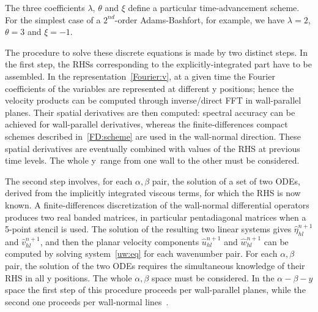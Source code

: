The three coefficients $\lambda$, $\theta$ and $\xi$ define a particular time-advancement scheme. For the simplest case of a $2^{nd}$-order Adams-Bashfort, for example, we have $\lambda= 2$, $\theta = 3$ and $\xi = -1$.\par
The procedure to solve these discrete equations is made by two distinct steps. In the first step, the RHSs corresponding to the explicitly-integrated  part have to be assembled. In the representation~\ref{Fourier:v}, at a given time the Fourier coefficients of the variables are represented at different y positions; hence the velocity products can be computed through inverse/direct FFT in wall-parallel planes. Their spatial derivatives are then computed: spectral accuracy can be achieved for wall-parallel derivatives, whereas the finite-differences compact schemes described in~\ref{FD:scheme} are used in the wall-normal direction. These spatial derivatives are eventually combined with values of the RHS at previous time levels. The whole y~range from one wall to the other must be considered. 
\par
The second step involves, for each $\alpha,\beta$ pair, the solution of a set of two ODEs, derived from the implicitly integrated viscous terms, for which the RHS is now known. A finite-differences discretization of the wall-normal differential operators produces two real banded matrices, in particular pentadiagonal matrices when a 5-point stencil is used. The solution of the resulting two linear systems gives $\hat{\eta}_{hl}^{n+1}$ and $\hat{v}_{hl}^{n+1}$, and then the planar velocity components $\hat{u}_{hl}^{n+1}$ and $\hat{w}_{hl}^{n+1}$ can be computed by solving system~\ref{uw:eq} for each wavenumber pair. For each $\alpha,\beta$ pair, the solution of the two ODEs requires the simultaneous knowledge of their RHS in all y positions. The whole $\alpha,\beta$ space must be considered. In the $\alpha - \beta - y$ space the first step of this procedure proceeds per wall-parallel planes, while the second one proceeds per wall-normal lines~\cite{cpl:presentazione}.

